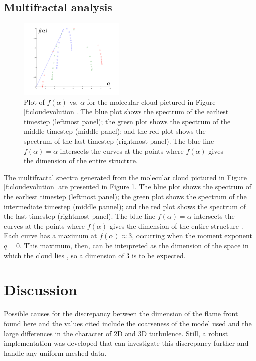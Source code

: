 \documentclass[iop]{emulateapj}
\begin{document}
\subsection{Multifractal analysis}\label{MultifractalResults}

\begin{figure}
	\begin{center}
	\includegraphics[width=0.45\textwidth,clip=true]{Graphics/falphaclouds.png}
	\caption{Plot of $f(\alpha)$ vs. $\alpha$ for the molecular cloud pictured in Figure \ref{f:cloudevolution}. The blue plot shows the spectrum of the earliest timestep (leftmost panel); the green plot shows the spectrum of the middle timestep (middle panel); and the red plot shows the spectrum of the last timestep (rightmost panel). The blue line $f(\alpha) = \alpha $ intersects the curves at the points where $f(\alpha)$ gives the dimension of the entire structure.
	\label{f:falphamultifractal}}
	\end{center}
	\end{figure} 

The multifractal spectra generated from the molecular cloud pictured in Figure \ref{f:cloudevolution} are presented in Figure \ref{f:falphamultifractal}. The blue plot shows the spectrum of the earliest timestep (leftmost panel); the green plot shows the spectrum of the intermediate timestep (middle pannel); and the red plot shows the spectrum of the last timestep (rightmost panel). The blue line $f(\alpha) = \alpha $ intersects the curves at the points where $f(\alpha)$ gives the dimension of the entire structure \citep{mandelbrotmultifractal}. Each curve has a maximum at $f(\alpha) \approx 3$, occurring when the moment exponent $q = 0$. This maximum, then, can be interpreted as the dimension of the space in which the cloud lies \citep{Schroeder}, so a dimension of 3 is to be expected. 

\section{Discussion}\label{Discussion}
Possible causes for the discrepancy between the dimension of the flame front found here and the values cited include the coarseness of the model used and the large differences in the character of 2D and 3D turbulence. Still, a robust implementation was developed that can investigate this discrepancy further and handle any uniform-meshed data.
 
\end{document}

